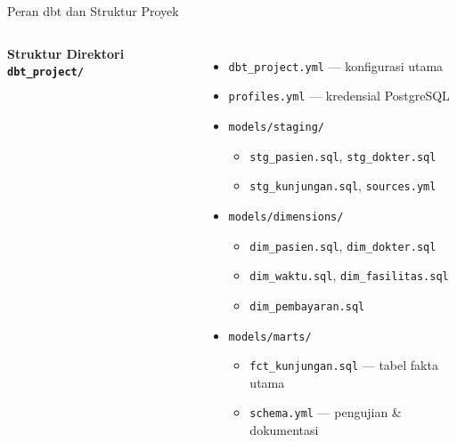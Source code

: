 \documentclass[xcolor=table,t,aspectratio=169]{beamer}
\begin{document}
\begin{frame}{Peran dbt dan Struktur Proyek}
\begin{columns}[T]
    \textbf{Struktur Direktori \texttt{dbt\_project/}}
    \begin{itemize}
      \scriptsize
      \item[\texttt{-}] \texttt{dbt\_project.yml} --- konfigurasi utama
      \item[\texttt{-}] \texttt{profiles.yml} --- kredensial PostgreSQL
      \item[\texttt{-}] \texttt{models/staging/}
        \begin{itemize}\tiny
          \item \texttt{stg\_pasien.sql}, \texttt{stg\_dokter.sql}
          \item \texttt{stg\_kunjungan.sql}, \texttt{sources.yml}
        \end{itemize}
      \item[\texttt{-}] \texttt{models/dimensions/}
        \begin{itemize}\tiny
          \item \texttt{dim\_pasien.sql}, \texttt{dim\_dokter.sql}
          \item \texttt{dim\_waktu.sql}, \texttt{dim\_fasilitas.sql}
          \item \texttt{dim\_pembayaran.sql}
        \end{itemize}
      \item[\texttt{-}] \texttt{models/marts/}
        \begin{itemize}\tiny
          \item \texttt{fct\_kunjungan.sql} --- tabel fakta utama
          \item \texttt{schema.yml} --- pengujian \& dokumentasi
        \end{itemize}
    \end{itemize}
  \end{columns}
\end{frame}
\end{document}

